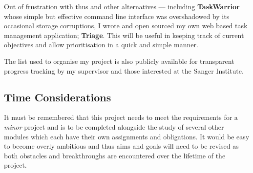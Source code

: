 Out of frustration with thus and other alternatives --- including
\textbf{TaskWarrior} whose simple but effective command line interface was
overshadowed by its occasional storage corruptions, I wrote and open sourced my
own web based task management application; \textbf{Triage}\citep{github:triage}.
This will be useful in keeping track of current objectives and allow
prioritisation in a quick and simple manner.

The list used to organise my project is also publicly available\citep{sam:triage}
for transparent progress tracking by my supervisor and those interested at the
Sanger Institute.


\subsection{Time Considerations}

It must be remembered that this project needs to meet the requirements for a
\textit{minor} project and is to be completed alongside the study of several
other modules which each have their own assignments and obligations. It would be
easy to become overly ambitious and thus aims and goals will need to be revised
as both obstacles and breakthroughs are encountered over the lifetime of the
project.

